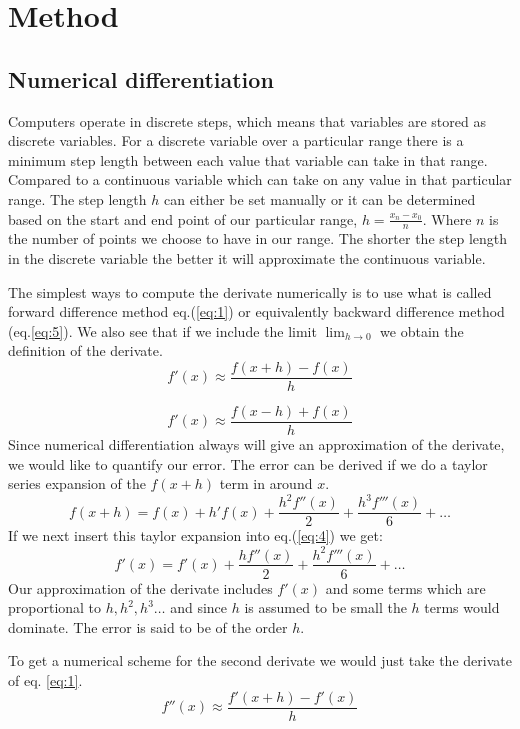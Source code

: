 \section*{Method}
\subsection*{Numerical differentiation}
\par Computers operate in discrete steps, which means that variables are stored as discrete variables. For a discrete variable over a particular range there is a minimum step length between each value that variable can take in that range. Compared to a continuous variable which can take on any value in that particular range. The step length $h$ can either be set manually or it can be determined based on the start and end point of our particular range, $h = \frac{x_n -x_0}{n}$. Where $n$ is the number of points we choose to have in our range. The shorter the step length in the discrete variable the better it will approximate the continuous variable.  
\par
The simplest ways to compute the derivate numerically is to use what is called forward difference method eq.(\ref{eq:1}) or equivalently backward difference method (eq.\ref{eq:5}). We also see that if we include the limit $\lim_{h\to 0}$ we obtain the definition of the derivate. 
\begin{equation}\label{eq:1}
    f'(x) \approx \frac{f(x+h)-f(x)}{h}
\end{equation}

\begin{equation}\label{eq:5}
  f'(x) \approx \frac{f(x-h)+f(x)}{h}
\end{equation}
Since numerical differentiation always will give an approximation of the derivate, we would like to quantify our error. The error can be derived if we do a taylor series expansion of the $f(x+h)$ term in around $x$.
\begin{equation}\label{eq:4}
    f(x+h) = f(x) + h'f(x) + \frac{h^2f''(x)}{2} + \frac{h^3f'''(x)}{6} + \dots    
\end{equation}   
If we next insert this taylor expansion into eq.(\ref{eq:4}) we get:
\begin{equation}
  f'(x) = f'(x) + \frac{h f''(x)}{2} + \frac{h^2f'''(x)}{6} + \dots
\end{equation} 
Our approximation of the derivate includes $f'(x)$ and some terms which are proportional to $h, h^2, h^3 \dots $ and since $h$ is assumed to be small the $h$ terms would dominate. The error is said to be of the order $h$. 
\par
To get a numerical scheme for the second derivate we would just take the derivate of eq. \ref{eq:1}. 
\begin{equation}
  f''(x) \approx \frac{f'(x+h)-f'(x)}{h}
\end{equation}
